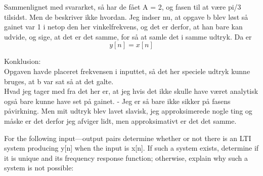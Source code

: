 \begin{Opgaver}
\begin{kapitel}
\begin{Opgave}
\begin{UnderOpgave}
                Sammenlignet med svararket, så har de fået A = 2, og fasen til at være pi/3 tilsidst. Men de beskriver ikke hvordan.
                \color{teal} Jeg indser nu, at opgave b blev løst så gainet var 1 i netop den her vinkelfrekvens, og det er derfor,
                at han bare kan udvide, og sige, at det er det samme, for så at samle det i samme udtryk. 
                Da er \[y[n] = x[n]\]
            \end{UnderOpgave}
            Konklusion:\\
            Opgaven havde placeret frekvensen i inputtet, så det her speciele udtryk kunne bruges, at b var sat så at det galte. \\
            Hvad jeg tager med fra det her er, at jeg hvis det ikke skulle have været analytisk også bare kunne have set på gainet. - Jeg er så bare ikke sikker på fasens påvirkning. 
            Men mit udtryk blev lavet slavisk, jeg approksimerede nogle ting og måske er det derfor jeg afviger lidt, men approksimativt er det det samme. 
        \end{Opgave}
        
        \begin{Opgave}
            For the following input—output pairs determine whether or not there is an LTI system
            producing y[n] when the input is x[n]. If such a system exists, determine if it is unique
            and its frequency response function; otherwise, explain why such a system is not
            possible:
            

\end{Opgave}
\end{kapitel}
\end{Opgaver}
